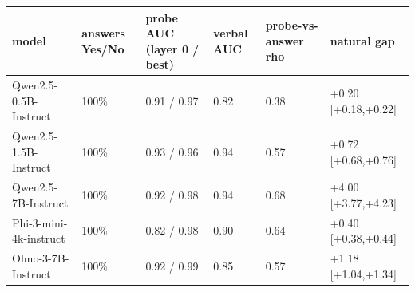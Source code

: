 \begin{tabular}{llllll}
\toprule
model & answers Yes/No & probe AUC (layer 0 / best) & verbal AUC & probe-vs-answer rho & natural gap \\
\midrule
Qwen2.5-0.5B-Instruct & 100\% & 0.91 / 0.97 & 0.82 & 0.38 & +0.20 [+0.18,+0.22] \\
Qwen2.5-1.5B-Instruct & 100\% & 0.93 / 0.96 & 0.94 & 0.57 & +0.72 [+0.68,+0.76] \\
Qwen2.5-7B-Instruct & 100\% & 0.92 / 0.98 & 0.94 & 0.68 & +4.00 [+3.77,+4.23] \\
Phi-3-mini-4k-instruct & 100\% & 0.82 / 0.98 & 0.90 & 0.64 & +0.40 [+0.38,+0.44] \\
Olmo-3-7B-Instruct & 100\% & 0.92 / 0.99 & 0.85 & 0.57 & +1.18 [+1.04,+1.34] \\
\bottomrule
\end{tabular}
